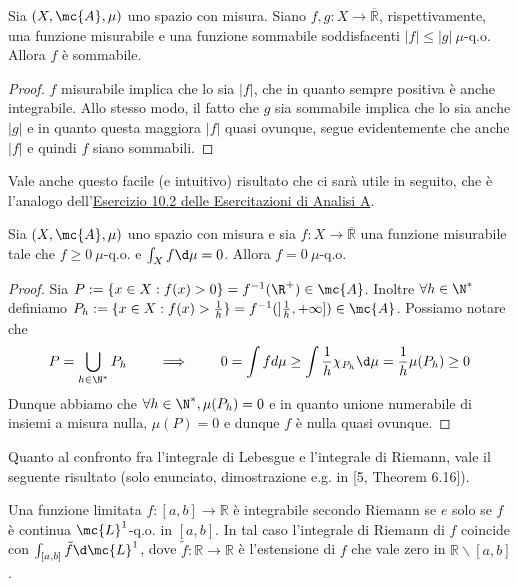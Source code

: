 \begin{corollary}[$*$]\label{cor: 2.1}
    Sia $(X, \mc{A}, \mu)$ uno spazio con misura. Siano $f, g: X \rightarrow \overline{\mathbb{R}}$, rispettivamente, una funzione misurabile e una funzione sommabile soddisfacenti $|f| \leq|g| \ \mu$-q.o. Allora $f$ è sommabile.
\end{corollary}
\begin{proof}
    $f$ misurabile implica che lo sia $|f|$, che in quanto sempre positiva è anche integrabile. Allo stesso modo, il fatto che $g$ sia sommabile implica che lo sia anche $|g|$ e in quanto questa maggiora $|f|$ quasi ovunque, segue evidentemente che anche $|f|$ e quindi $f$ siano sommabili.
\end{proof}
Vale anche questo facile (e intuitivo) risultato che ci sarà utile in seguito, che è l'analogo dell'\href{https://github.com/davideborra/esercitazione-analisi-A-2022-23/raw/main/E10%20-%2028.11.2022/main.pdf}{Esercizio 10.2 delle Esercitazioni di Analisi A}.

\begin{proposition}[$*$]\label{prop: 2.4}
    Sia $(X, \mc{A}, \mu)$ uno spazio con misura e sia $f: X \rightarrow \overline{\mathbb{R}}$ una funzione misurabile tale che $f \geq 0 \ \mu$-q.o. e $\int_{X} f \d \mu=0$. Allora $f=0 \ \mu$-q.o.
\end{proposition}
\begin{proof}
    Sia $P := \{x \in X : f(x)>0\} = f^{-1}(\R^+) \in \mc{A}$. Inoltre $\forall h \in \N^*$ definiamo $P_h := \{x \in X : f(x)>\frac{1}{h}\} = f^{-1}(]\frac{1}{h},+\infty]) \in \mc{A}$. Possiamo notare che \[P = \bigcup_{h \in \N^*} P_h \qquad \implies\qquad 0 = \int f d\mu \ge \int \frac{1}{h}\chi_{P_h} \d \mu = \frac{1}{h}\mu(P_h) \ge 0\]
    Dunque abbiamo che $\forall h \in \N^*, \mu(P_h) = 0$ e in quanto unione numerabile di insiemi a misura nulla, $\mu(P) = 0$ e dunque $f$ è nulla quasi ovunque.
\end{proof}

Quanto al confronto fra l'integrale di Lebesgue e l'integrale di Riemann, vale il seguente risultato (solo enunciato, dimostrazione e.g. in [5, Theorem 6.16]).

\begin{shadedTheorem}
    Una funzione limitata $f:[a, b] \rightarrow \mathbb{R}$ è integrabile secondo Riemann se $e$ solo se $f$ è continua $\mc{L}^{1}$-q.o. in $[a, b]$. In tal caso l'integrale di Riemann di $f$ coincide con $\int_{[a, b]} \tilde{f} \d \mc{L}^{1}$, dove $\tilde{f}: \mathbb{R} \rightarrow \mathbb{R}$ è l'estensione di $f$ che vale zero in $\mathbb{R} \backslash[a, b]$.
\end{shadedTheorem}

